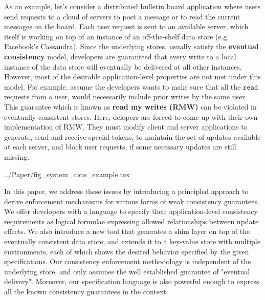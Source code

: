 As an example, let's consider a distributed bulletin board application where users
send requests to a cloud of servers to post a message or to read the current
messages on the board. Each user request is sent to an available server,
which itself is working on top of an instance of an off-the-shelf data
store (e.g. Facebook's Cassandra). 
Since the underlying stores, usually satisfy the {\bf eventual consistency} model, 
developers are guaranteed  that every write to a local instance of the data 
store will eventually  be delivered at all other instances. However, 
most of the desirable application-level properties are not met under this model.          
For example, assume the developers wants to make sure that all the
$\mathtt{read}$ requests from
a user, would necessarily include prior writes by the same user.  This
guarantee which is known as {\bf read my writes (RMW)} can be violated in
eventually consistent stores.  
Here, delopers are forced to come up with their own implementation of
RMW. They must modify client and server applications to generate, send
and receive special tokens, to maintain the set of updates available at
each server, and block user requests, if some necessary updates are
still missing.


 {../Paper/fig_system_cons_example.tex}

In this paper, we address these issues by introducing a principled approach to 
derive enforcement mechanisms for various forms of weak consistency 
guarantees. We offer developers with a language to specify their application-level consistency 
requirements as logical formulae expressing allowed relationships between update effects. 
We also introduce a new tool that generates a shim layer on top of the eventually 
consistent data store, and extends it to a key-value store with multiple environments, each of which 
shows the desired behavior specified by the given specifications. Our consistency enforcement 
methodology is independent of the underlying store, and only assumes the well established 
guarantee of "eventual delivery". 
Moreover, our specification language is also powerful enough to express all the known consistency 
guarantees in the context. 

